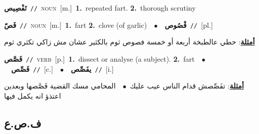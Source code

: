 \documentclass[10pt,a4paper,twoside]{article} %
\begin{document}
\begin{multicols}{2}
{\setlength\topsep{0pt}\textbf{\foreignlanguage{arabic}{تَفْصِيص}}\ {\color{gray}\texttt{//}\color{black}}\ \textsc{noun}\ [m.]\ \textbf{1.}~repeated fart.  \textbf{2.}~thorough scrutiny\ } \vspace{2mm}

{\setlength\topsep{0pt}\textbf{\foreignlanguage{arabic}{فَصّ}}\ {\color{gray}\texttt{//}\color{black}}\ \textsc{noun}\ [m.]\ \textbf{1.}~fart  \textbf{2.}~clove (of garlic)\ \ $\bullet$\ \ \setlength\topsep{0pt}\textbf{\foreignlanguage{arabic}{فْصُوص}}\ {\color{gray}\texttt{//}\color{black}}\ [pl.]\  \begin{flushright}\color{gray}\foreignlanguage{arabic}{\textbf{\underline{\foreignlanguage{arabic}{أمثلة}}}: حطي عالطبخة أربعة أو خمسة  فصوص ثوم بالكثير عشان مش زاكي تكثري ثوم}\end{flushright}\color{black}} \vspace{2mm}

{\setlength\topsep{0pt}\textbf{\foreignlanguage{arabic}{فَصَّص}}\ {\color{gray}\texttt{//}\color{black}}\ \textsc{verb}\ [p.]\ \textbf{1.}~dissect or analyse (a subject).  \textbf{2.}~fart\ \ $\bullet$\ \ \setlength\topsep{0pt}\textbf{\foreignlanguage{arabic}{فَصِّص}}\ {\color{gray}\texttt{//}\color{black}}\ [c.]\ \ $\bullet$\ \ \setlength\topsep{0pt}\textbf{\foreignlanguage{arabic}{يفَصِّص}}\ {\color{gray}\texttt{//}\color{black}}\ [i.]\  \begin{flushright}\color{gray}\foreignlanguage{arabic}{\textbf{\underline{\foreignlanguage{arabic}{أمثلة}}}: تفَصِّصش قدام الناس عيب عليك\ $\bullet$\ \  المحامي مسك القضية فَصَّصها وبعدين اعتذؤ انه يكمل فيها}\end{flushright}\color{black}} \vspace{2mm}

\vspace{-3mm}
\subsection*{\color{blue}\foreignlanguage{arabic}{ف.ص.ع}\color{blue}{}} 


\end{multicols}
\end{document}
